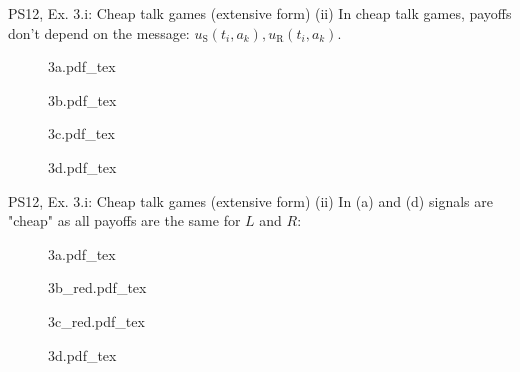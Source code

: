 \begin{frame}{PS12, Ex. 3.i: Cheap talk games (extensive form)}
    (ii) In cheap talk games, payoffs don't depend on the message: $u_\text{S}(t_i,a_k),u_\text{R}(t_i,a_k)$.\vspace{-6pt}
    \begin{multicols}{2}
      \begin{figure}[!h]
        \center{}
        {3a.pdf_tex}
      \end{figure}\vspace{-6pt}
      \begin{figure}[!h]
        \center{}
        {3b.pdf_tex}
      \end{figure}
      \vfill\null\columnbreak
      \begin{figure}[!h]
        \center{}
        {3c.pdf_tex}
      \end{figure}\vspace{-6pt}
      \begin{figure}[!h]
        \center{}
        {3d.pdf_tex}
      \end{figure}
      \vfill\null
    \end{multicols}
\end{frame}
\begin{frame}{PS12, Ex. 3.i: Cheap talk games (extensive form)}
    (ii) In (a) and (d) signals are "cheap" as all payoffs are the same for $L$ and $R$:\vspace{-14pt}
    \begin{multicols}{2}
      \vfill\null\vspace{-10.2pt}
      \begin{figure}[!h]
        \center{}
        {3a.pdf_tex}
      \end{figure}\vspace{-20.3pt}
      \begin{figure}[!h]
        \center{}
        {3b_red.pdf_tex}
      \end{figure}
      \vfill\null\columnbreak
      \begin{figure}[!h]
        \center{}
        {3c_red.pdf_tex}
      \end{figure}\vspace{-9pt}
      \begin{figure}[!h]
        \center{}
        {3d.pdf_tex}
      \end{figure}
      \vfill\null
    \end{multicols}
\end{frame}

